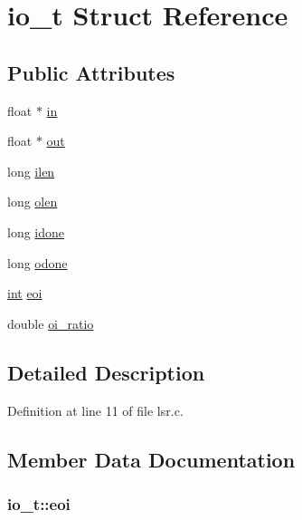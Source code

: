 \hypertarget{structio__t}{}\section{io\+\_\+t Struct Reference}
\label{structio__t}
\subsection*{Public Attributes}
\begin{DoxyCompactItemize}
\item 
float $\ast$ \hyperlink{structio__t_a14bfa8629c0718832491dfce0a901541}{in}
\item 
float $\ast$ \hyperlink{structio__t_a7b0d24f27a02a9463729fd249a7cde92}{out}
\item 
long \hyperlink{structio__t_a35fa9a6d9d270f8b0cfac647fc601320}{ilen}
\item 
long \hyperlink{structio__t_ada97da468f87f6edf29b5e74851f6ec1}{olen}
\item 
long \hyperlink{structio__t_a6b516e6573f44ec3439ba54dd01a3d6d}{idone}
\item 
long \hyperlink{structio__t_a214ab873ded1d3f2848e96b2826fd541}{odone}
\item 
\hyperlink{xmltok_8h_a5a0d4a5641ce434f1d23533f2b2e6653}{int} \hyperlink{structio__t_a8f13f87a9b78c97729609ce579098a12}{eoi}
\item 
double \hyperlink{structio__t_abe24f477b0a765c6cfdd143aa55d892e}{oi\+\_\+ratio}
\end{DoxyCompactItemize}


\subsection{Detailed Description}


Definition at line 11 of file lsr.\+c.



\subsection{Member Data Documentation}
\subsubsection[{\texorpdfstring{eoi}{eoi}}]{ io\+\_\+t\+::eoi}\hypertarget{structio__t_a8f13f87a9b78c97729609ce579098a12}{}\label{structio__t_a8f13f87a9b78c97729609ce579098a12}


